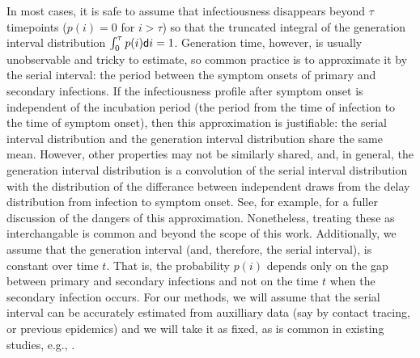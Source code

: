 In most cases, it is safe to assume that
infectiousness disappears beyond $\tau$ timepoints ($p(i) = 0$ for $i > \tau$)
so that the truncated integral of the generation interval distribution
$\int_0^\tau p(i)\mathsf{d} i = 1$. 
Generation time, however, is usually unobservable and tricky to estimate, so
common practice is to approximate it by the serial interval: the period between
the symptom onsets of primary and secondary infections. If the infectiousness
profile after symptom onset is independent of the incubation period (the period
from the time of infection to the time of symptom onset), then this
approximation is justifiable: the serial interval distribution and the
generation interval distribution share the same mean. However, other properties
may not be similarly shared, and, in general, the generation interval
distribution is a convolution of the serial interval distribution with the
distribution of the differance between independent draws from the delay
distribution from infection to symptom onset. See, for example,
\citep{gostic2020practical} for a fuller discussion of the dangers of this
approximation. Nonetheless, treating these as interchangable is common
\citep{cori2013new} and beyond the scope of this work. Additionally, we assume
that the generation interval (and, therefore, the serial interval), is constant over time
$t$. That is, the probability $p(i)$ depends only on the gap between primary and
secondary infections and not on the time $t$ when the secondary infection
occurs. For our methods, we will assume that the serial interval can be
accurately estimated from auxilliary data (say by contact tracing, or previous
epidemics) and we will take it as fixed, as is common in existing studies, e.g.,
\cite{cori2013new,abry2020spatial,pascal2022nonsmooth}.

